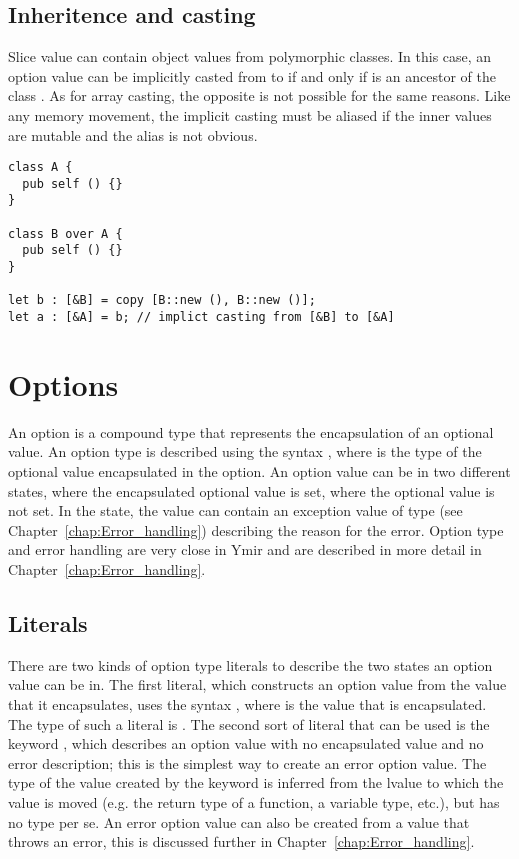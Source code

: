 \subsection{Inheritence and casting}

Slice value can contain object values from polymorphic classes. In this case, an
option value can be implicitly casted from \token{[B]} to \token{[A]} if and
only if  is an ancestor of the class . As for array casting,
the opposite is not possible for the same reasons. Like any memory movement, the
implicit casting must be aliased if the inner values are mutable and the alias
is not obvious.

\begin{lstlisting}[style=coloredverbatim]
class A {
  pub self () {}
}

class B over A {
  pub self () {}
}

let b : [&B] = copy [B::new (), B::new ()];
let a : [&A] = b; // implict casting from [&B] to [&A]
\end{lstlisting}

\vfill%
\pagebreak

\section{Options}%
\label{sec:options}

An option is a compound type that represents the encapsulation of an optional
value. An option type is described using the syntax , where
 is the type of the optional value encapsulated in the option. An
option value can be in two different states,  where the encapsulated
optional value is set,  where the optional value is not set. In the
 state, the value can contain an exception value of type
 (see Chapter~\ref{chap:Error_handling}) describing the
reason for the error. Option type and error handling are very close in Ymir and
are described in more detail in Chapter~\ref{chap:Error_handling}.

\subsection{Literals}

There are two kinds of option type literals to describe the two states an option
value can be in. The first literal, which constructs an option value from the
value that it encapsulates, uses the syntax , where  is the
value that is encapsulated. The type of such a literal is .
The second sort of literal that can be used is the keyword , which
describes an option value with no encapsulated value and no error description;
this is the simplest way to create an error option value. The type of the value
created by the keyword  is inferred from the lvalue to which the
value is moved (e.g. the return type of a function, a variable type, etc.), but
has no type per se. An error option value can also be created from a value that
throws an error, this is discussed further in Chapter~\ref{chap:Error_handling}.

